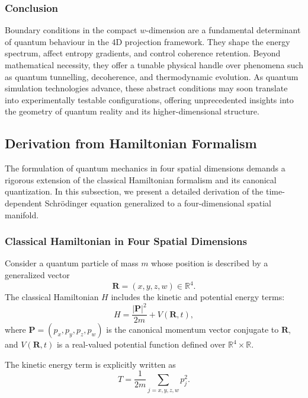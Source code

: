 \documentclass[12pt]{article}
\begin{document}
\subsubsection*{Conclusion}

Boundary conditions in the compact \(w\)-dimension are a fundamental determinant of quantum behaviour in the 4D projection framework. They shape the energy spectrum, affect entropy gradients, and control coherence retention. Beyond mathematical necessity, they offer a tunable physical handle over phenomena such as quantum tunnelling, decoherence, and thermodynamic evolution. As quantum simulation technologies advance, these abstract conditions may soon translate into experimentally testable configurations, offering unprecedented insights into the geometry of quantum reality and its higher-dimensional structure.


\subsection{Derivation from Hamiltonian Formalism}

The formulation of quantum mechanics in four spatial dimensions demands a rigorous extension of the classical Hamiltonian formalism and its canonical quantization. In this subsection, we present a detailed derivation of the time-dependent Schrödinger equation generalized to a four-dimensional spatial manifold.

\subsubsection*{Classical Hamiltonian in Four Spatial Dimensions}

Consider a quantum particle of mass \(m\) whose position is described by a generalized vector
\begin{equation}
    \mathbf{R} = (x, y, z, w) \in \mathbb{R}^4.
\end{equation}
The classical Hamiltonian \(H\) includes the kinetic and potential energy terms:
\begin{equation}
    H = \frac{|\mathbf{P}|^2}{2m} + V(\mathbf{R}, t),
    \label{eq:classical_Hamiltonian}
\end{equation}
where \(\mathbf{P} = (p_x, p_y, p_z, p_w)\) is the canonical momentum vector conjugate to \(\mathbf{R}\), and \(V(\mathbf{R}, t)\) is a real-valued potential function defined over \(\mathbb{R}^4 \times \mathbb{R}\).

The kinetic energy term is explicitly written as
\begin{equation}
    T = \frac{1}{2m} \sum_{j=x,y,z,w} p_j^2.
\end{equation}
\end{document}
